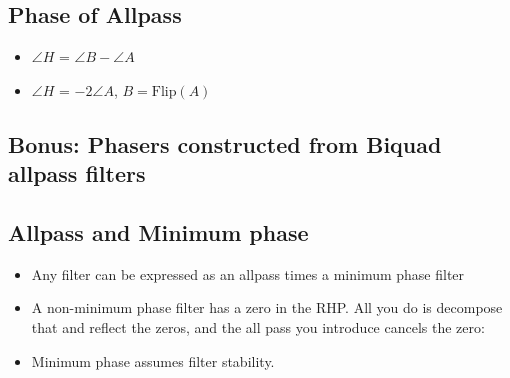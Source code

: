 \subsection*{Phase of Allpass}
\begin{itemize}
\item{$\angle H$ = $\angle B - \angle A$}
\item{$\angle H$ = $- 2\angle A$, $B = \mbox{Flip}(A)$}
\end{itemize}
\subsection*{Bonus: Phasers constructed from Biquad allpass filters}


\subsection*{Allpass and Minimum phase}
\begin{itemize}
\item{Any filter can be expressed as an allpass times a minimum phase
filter}
\item{A non-minimum phase filter has a zero in the RHP. All you do
is decompose that and reflect the zeros, and the all pass you introduce
cancels the zero:
}
\item{
Minimum phase assumes filter stability.
}
\end{itemize}

